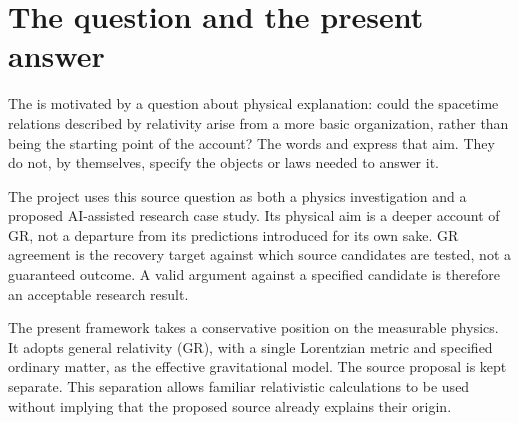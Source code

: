\documentclass[11pt]{article}
\begin{document}

\section{The question and the present answer}
The \TheoryProgram{} is motivated by a question about physical explanation: could the spacetime relations described by relativity arise from a more basic organization, rather than being the starting point of the account? The words \emph{\Aether{}} and \emph{\Aflow{}} express that aim. They do not, by themselves, specify the objects or laws needed to answer it.

The project uses this source question as both a physics investigation and a proposed AI-assisted research case study. Its physical aim is a deeper account of GR, not a departure from its predictions introduced for its own sake. GR agreement is the recovery target against which source candidates are tested, not a guaranteed outcome. A valid argument against a specified candidate is therefore an acceptable research result.

The present framework takes a conservative position on the measurable physics. It adopts general relativity (GR), with a single Lorentzian metric and specified ordinary matter, as the effective gravitational model. The source proposal is kept separate. This separation allows familiar relativistic calculations to be used without implying that the proposed source already explains their origin.
\end{document}
